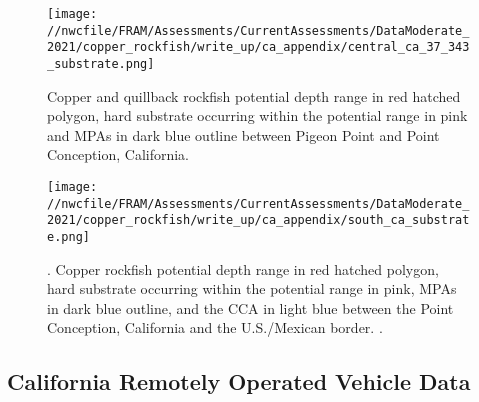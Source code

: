 \documentclass[11pt,
  english,
  a4paper,
]{article}
\begin{document}
\tagmcend\tagstructend


\begin{figure}
\centering
\texttt{[image: //nwcfile/FRAM/Assessments/CurrentAssessments/DataModerate\_2021/copper\_rockfish/write\_up/ca\_appendix/central\_ca\_37\_343\_substrate.png]}
\caption{Copper and quillback rockfish potential depth range in red hatched polygon, hard substrate occurring within the potential range in pink and MPAs in dark blue outline between Pigeon Point and Point Conception, California.\label{fig:central-ca-south-app}}
\end{figure}

\tagmcend\tagstructend


\begin{figure}
\centering
\texttt{[image: //nwcfile/FRAM/Assessments/CurrentAssessments/DataModerate\_2021/copper\_rockfish/write\_up/ca\_appendix/south\_ca\_substrate.png]}
\caption{. Copper rockfish potential depth range in red hatched polygon, hard substrate occurring within the potential range in pink, MPAs in dark blue outline, and the CCA in light blue between the Point Conception, California and the U.S./Mexican border. .\label{fig:south-ca-app}}
\end{figure}

\tagmcend\tagstructend

\newpage


\hypertarget{california-remotely-operated-vehicle-data}{%
\subsection{California Remotely Operated Vehicle Data}\label{california-remotely-operated-vehicle-data}}
\end{document}
